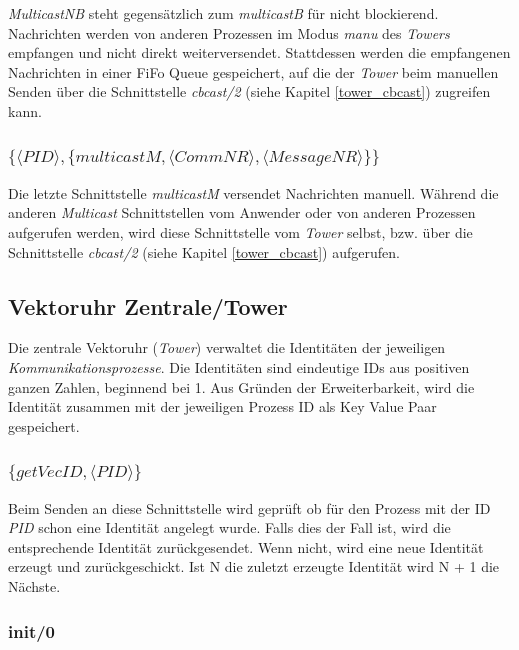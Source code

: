 \textit{MulticastNB} steht gegensätzlich zum \textit{multicastB} für nicht blockierend. Nachrichten werden von anderen Prozessen im Modus \textit{manu} des \textit{Towers} empfangen und nicht direkt weiterversendet. Stattdessen werden die empfangenen Nachrichten in einer FiFo Queue gespeichert, auf die der \textit{Tower} beim manuellen Senden über die Schnittstelle \textit{cbcast/2} (siehe Kapitel \ref{tower_cbcast}) zugreifen kann.

\subsubsection{$\{\langle PID\rangle,\{multicastM,\langle CommNR\rangle,\langle MessageNR\rangle\}\}$}

Die letzte Schnittstelle \textit{multicastM} versendet Nachrichten manuell. Während die anderen \textit{Multicast} Schnittstellen vom Anwender oder von anderen Prozessen aufgerufen werden, wird diese Schnittstelle vom \textit{Tower} selbst, bzw. über die Schnittstelle \textit{cbcast/2} (siehe Kapitel \ref{tower_cbcast}) aufgerufen.

\subsection{Vektoruhr Zentrale/Tower} \label{tower}

Die zentrale Vektoruhr (\textit{Tower}) verwaltet die Identitäten der jeweiligen \textit{Kommunikationsprozesse}. Die Identitäten sind eindeutige IDs aus positiven ganzen Zahlen, beginnend bei 1.
Aus Gründen der Erweiterbarkeit, wird die Identität zusammen mit der jeweiligen Prozess ID als Key Value Paar gespeichert.

\subsubsection{$\{getVecID,\langle PID\rangle\}$}

Beim Senden an diese Schnittstelle wird geprüft ob für den Prozess mit der ID \textit{PID} schon eine Identität angelegt wurde. Falls dies der Fall ist, wird die entsprechende Identität zurückgesendet. Wenn nicht, wird eine neue Identität erzeugt und zurückgeschickt. Ist N die zuletzt erzeugte Identität wird N + 1 die Nächste.

\subsubsection{init/0}

